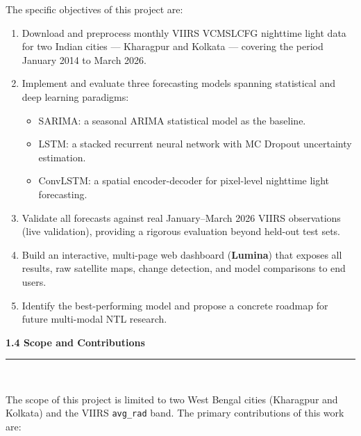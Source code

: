 \documentclass[12pt,a4paper]{report}
\begin{document}
The specific objectives of this project are:

\begin{enumerate}[leftmargin=1.5cm]
    \item Download and preprocess monthly VIIRS VCMSLCFG nighttime light data for two Indian cities --- Kharagpur and Kolkata --- covering the period January 2014 to March 2026.
    \item Implement and evaluate three forecasting models spanning statistical and deep learning paradigms:
        \begin{itemize}
            \item SARIMA: a seasonal ARIMA statistical model as the baseline.
            \item LSTM: a stacked recurrent neural network with MC Dropout uncertainty estimation.
            \item ConvLSTM: a spatial encoder-decoder for pixel-level nighttime light forecasting.
        \end{itemize}
    \item Validate all forecasts against real January--March 2026 VIIRS observations (live validation), providing a rigorous evaluation beyond held-out test sets.
    \item Build an interactive, multi-page web dashboard (\textbf{Lumina}) that exposes all results, raw satellite maps, change detection, and model comparisons to end users.
    \item Identify the best-performing model and propose a concrete roadmap for future multi-modal NTL research.
\end{enumerate}

\vspace{0.5cm}
\begin{center}
    \hypertarget{sec:s14}{}%
    {\large \textbf{1.4 Scope and Contributions}}\\[0.3cm]
    \noindent\rule{\linewidth}{0.4pt}\\[0.5cm]
\end{center}

The scope of this project is limited to two West Bengal cities (Kharagpur and Kolkata) and the VIIRS \texttt{avg\_rad} band. The primary contributions of this work are:
\end{document}
